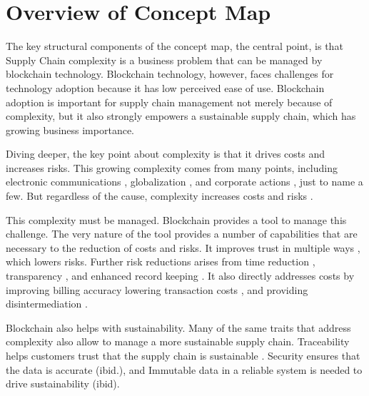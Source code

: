 \section{Overview of Concept Map}

The key structural components of the concept map, the central point, is that Supply Chain complexity is a business problem that can be managed by blockchain technology. Blockchain technology, however, faces challenges for technology adoption because it has low perceived ease of use. Blockchain adoption is important for supply chain management not merely because of complexity, but it also strongly empowers a sustainable supply chain, which has growing business importance.

Diving deeper, the key point about complexity is that it drives costs and increases risks. This growing complexity comes from many points, including electronic communications \parencite{bojnecImpactInternetManufacturing2009}, globalization \parencite{fujitaGlobalizationEvolutonSupply2006}, and corporate actions \parencite{linawatiSupplyChainFlexibility2017}, just to name a few. But regardless of the cause, complexity increases costs and risks \parencite{thomasCostsBenefitsAdoption2016, wangRiskTransmissionComplex2021}.

This complexity must be managed. Blockchain provides a tool to manage this challenge. The very nature of the tool provides a number of capabilities that are necessary to the reduction of costs and risks. It improves trust in multiple ways \parencite{sahaiEnablingPrivacyTraceability2020, liuPrivacyProtectionFog2020, chanSimpleScalableBlockchain2021}, which lowers risks. Further risk reductions arises from time reduction \parencite{ivanovImpactDigitalTechnology2019}, transparency \parencite{pavlovHybridFuzzyProbabilisticApproach2018}, and enhanced record keeping \parencite{ibmHowBlockchainCan2016}.  It also directly addresses costs by improving billing accuracy \parencite{groenfeldtIBMMaerskApply2017} lowering transaction costs \parencite{schmidtBlockchainSupplyChain2019}, and providing disintermediation \parencite{crosbyBlockChainTechnologyBitcoin2016}.

Blockchain also helps with sustainability. Many of the same traits that address complexity also allow to manage a more sustainable supply chain. Traceability helps customers trust that the supply chain is sustainable \parencite{saberiBlockchainTechnologyIts2019, wangUnderstandingBlockchainTechnology2019}. Security ensures that the data is accurate (ibid.), and Immutable data in a reliable system is needed to drive sustainability (ibid).

